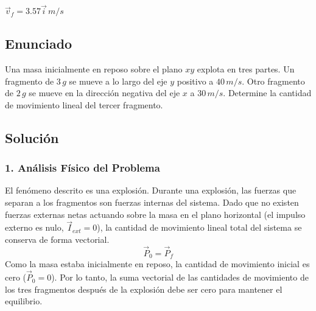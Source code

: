 \documentclass[12pt, a4paper]{article}
\begin{document}
\begin{tcolorbox}[colback=green!5!white, colframe=green!50!black, title=Respuesta Final]
\centering \Large $\vec{v}_f = 3.57 \vec{i} \, \si{m/s}$
\end{tcolorbox}

\newpage

\subsection*{Enunciado}
Una masa inicialmente en reposo sobre el plano $xy$ explota en tres partes. Un fragmento de $3 \, \si{g}$ se mueve a lo largo del eje $y$ positivo a $40 \, \si{m/s}$. Otro fragmento de $2 \, \si{g}$ se mueve en la dirección negativa del eje $x$ a $30 \, \si{m/s}$. Determine la cantidad de movimiento lineal del tercer fragmento.

\begin{center}
\end{center}

\subsection*{Solución}

\subsubsection*{1. Análisis Físico del Problema}
El fenómeno descrito es una explosión. Durante una explosión, las fuerzas que separan a los fragmentos son fuerzas internas del sistema. Dado que no existen fuerzas externas netas actuando sobre la masa en el plano horizontal (el impulso externo es nulo, $\vec{I}_{ext} = 0$), la cantidad de movimiento lineal total del sistema se conserva de forma vectorial.
\[ \vec{P}_0 = \vec{P}_f \]
Como la masa estaba inicialmente en reposo, la cantidad de movimiento inicial es cero ($\vec{P}_0 = 0$). Por lo tanto, la suma vectorial de las cantidades de movimiento de los tres fragmentos después de la explosión debe ser cero para mantener el equilibrio.
\end{document}
